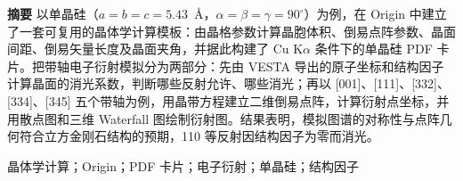 {\bfseries 摘要}\quad
以单晶硅（$a=b=c=5.43$~\AA，$\alpha=\beta=\gamma=90^\circ$）为例，在 Origin 中建立了一套可复用的晶体学计算模板：由晶格参数计算晶胞体积、倒易点阵参数、晶面间距、倒易矢量长度及晶面夹角，并据此构建了 Cu K$\alpha$ 条件下的单晶硅 PDF 卡片。把带轴电子衍射模拟分为两部分：先由 VESTA 导出的原子坐标和结构因子计算晶面的消光系数，判断哪些反射允许、哪些消光；再以 [001]、[111]、[332]、[334]、[345] 五个带轴为例，用晶带方程建立二维倒易点阵，计算衍射点坐标，并用散点图和三维 Waterfall 图绘制衍射图。结果表明，模拟图谱的对称性与点阵几何符合立方金刚石结构的预期，110 等反射因结构因子为零而消光。

\vspace{4pt}

\par{}晶体学计算；Origin；PDF 卡片；电子衍射；单晶硅；结构因子
